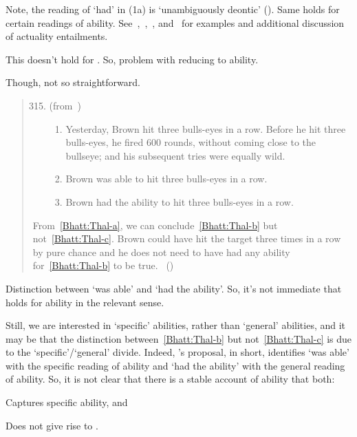 \begin{note}
{    Note, the reading of `had' in (1a) is `unambiguously deontic' (\citeyear[703]{Alxatib:2019wf}).
    Same holds for certain readings of ability.
    See~\textcite{Bhatt:1999ud,Bhatt:2008wt},~\textcite{Hacquard:2006to,Hacquard:2009ta},~\textcite{Pinon:2003te}, and~\textcite{Werner:2011tp} for examples and additional discussion of actuality entailments.
  }

  This doesn't hold for .
  So, problem with reducing to ability.

  Though, not so straightforward.

  \begin{quote}
    \begin{enumerate}[label=(\arabic*)]
      \setcounter{enumi}{314}
    \item
      (from~\cite{Thalberg:1969ta})
      \begin{enumerate}[label=\alph*., ref=(315\alph*)]
      \item
        \label{Bhatt:Thal-a}
        Yesterday, Brown hit three bulls-eyes in a row. Before he hit three bulls-eyes, he fired 600 rounds, without coming close to the bullseye; and his subsequent tries were equally wild.
      \item
        \label{Bhatt:Thal-b}
        Brown was able to hit three bulls-eyes in a row.
      \item
        \label{Bhatt:Thal-c}
        Brown had the ability to hit three bulls-eyes in a row.
      \end{enumerate}
    \end{enumerate}
    From~\ref{Bhatt:Thal-a}, we can conclude~\ref{Bhatt:Thal-b} but not~\ref{Bhatt:Thal-c}.
    Brown could have hit the target three times in a row by pure chance and he does not need to have had any ability for~\ref{Bhatt:Thal-b} to be true.%
    \mbox{ }\hfill\mbox{(\citeyear[167]{Bhatt:2008wt})}
  \end{quote}
  Distinction between `was able' and `had the ability'.
  So, it's not immediate that \BoyPS{} holds for ability in the relevant sense.

  Still, we are interested in `specific' abilities, rather than `general' abilities, and it may be that the distinction between~\ref{Bhatt:Thal-b} but not~\ref{Bhatt:Thal-c} is due to the `specific'/`general' divide.
  Indeed, \citeauthor{Bhatt:2008wt}'s proposal, in short, identifies `was able' with the specific reading of ability and `had the ability' with the general reading of ability.
  So, it is not clear that there is a stable account of ability that both:
  \begin{enumerate*}
  \item
    Captures specific ability, and
  \item
    Does not give rise to \BoyPS{}.
  \end{enumerate*}
\end{note}

